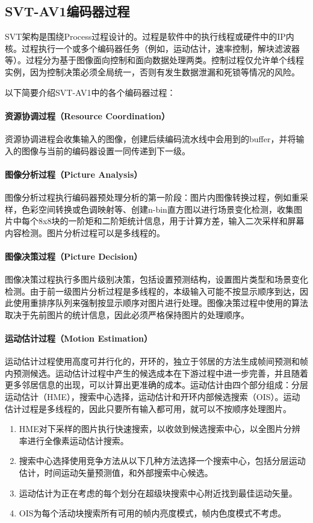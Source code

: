 \subsection{SVT-AV1编码器过程}
  SVT架构是围绕Process过程设计的。过程是软件中的执行线程或硬件中的IP内核。过程执行一个或多个编码器任务（例如，运动估计，速率控制，解块滤波器等）。过程分为基于图像面向控制和面向数据处理两类。控制过程仅允许单个线程实例，因为控制决策必须全局统一，否则有发生数据泄漏和死锁等情况的风险。

  以下简要介绍SVT-AV1中的各个编码器过程：
  \paragraph{资源协调过程（Resource Coordination）} 资源协调进程会收集输入的图像，创建后续编码流水线中会用到的buffer，并将输入的图像与当前的编码器设置一同传递到下一级。

  \paragraph{图像分析过程（Picture Analysis）} 图像分析过程执行编码器预处理分析的第一阶段：图片内图像转换过程，例如重采样，色彩空间转换或色调映射等、创建n-bin直方图以进行场景变化检测，收集图片中每个8x8块的一阶矩和二阶矩统计信息，用于计算方差，输入二次采样和屏幕内容检测。图片分析过程可以是多线程的。

  \paragraph{图像决策过程（Picture Decision）} 图像决策过程执行多图片级别决策，包括设置预测结构，设置图片类型和场景变化检测。由于前一级图片分析过程是多线程的，本级输入可能不按显示顺序到达，因此使用重排序队列来强制按显示顺序对图片进行处理。图像决策过程中使用的算法取决于先前图片的统计信息，因此必须严格保持图片的处理顺序。

  \paragraph{运动估计过程（Motion Estimation）} 运动估计过程使用高度可并行化的，开环的，独立于邻居的方法生成帧间预测和帧内预测候选。运动估计过程中产生的候选成本在下游过程中进一步完善，并且随着更多邻居信息的出现，可以计算出更准确的成本。运动估计由四个部分组成：分层运动估计（HME），搜索中心选择，运动估计和开环内部候选搜索（OIS）。运动估计过程是多线程的，因此只要所有输入都可用，就可以不按顺序处理图片。
  \begin{enumerate} [label=\arabic*)]
    \item HME对下采样的图片执行快速搜索，以收敛到候选搜索中心，以全图片分辨率进行全像素运动估计搜索。
    \item 搜索中心选择使用竞争方法从以下几种方法选择一个搜索中心，包括分层运动估计，时间运动矢量预测值，和外部搜索中心候选。
    \item 运动估计为正在考虑的每个划分在超级块搜索中心附近找到最佳运动矢量。
    \item OIS为每个活动块搜索所有可用的帧内亮度模式，帧内色度模式不考虑。
  \end{enumerate}

